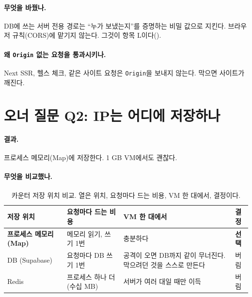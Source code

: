 \paragraph{무엇을 바꿨나.}
DB에 쓰는 서버 전용 경로는 ``누가 보냈는지''를 증명하는 비밀 값으로 지킨다.
브라우저 규칙(CORS)에 맡기지 않는다.
그것이 항목 L이다().

\paragraph{왜 \texttt{Origin} 없는 요청을 통과시키나.}
Next SSR, 헬스 체크, 같은 사이트 요청은 \texttt{Origin}을 보내지 않는다.
막으면 사이트가 깨진다.

\section{오너 질문 Q2: IP는 어디에 저장하나}\label{sec:bl-q2}

\paragraph{결과.}
프로세스 메모리(Map)에 저장한다.
1 GB VM에서도 괜찮다.

\paragraph{무엇을 비교했나.}

\begin{table}[H]
  \caption{카운터 저장 위치 비교. 열은 위치, 요청마다 드는 비용, VM 한 대에서, 결정이다.}
  \label{tab:bl-q2}
  \centering\footnotesize
  \begin{tabularx}{\linewidth}{@{}L{2.8cm}L{3.0cm}Y L{1.4cm}@{}}
    \toprule
    저장 위치 & 요청마다 드는 비용 & VM 한 대에서 & 결정 \\
    \midrule
    \textbf{프로세스 메모리 (Map)} & 메모리 읽기, 쓰기 1번 & 충분하다 & \textbf{선택} \\
    \midrule
    DB (Supabase) & 요청마다 DB 쓰기 1번 & 공격이 오면 DB까지 같이 무너진다. 막으려던 것을 스스로 만든다 & 버림 \\
    \midrule
    Redis & 프로세스 하나 더 (수십 MB) & 서버가 여러 대일 때만 이득 & 버림 \\
    \bottomrule
  \end{tabularx}
\end{table}

